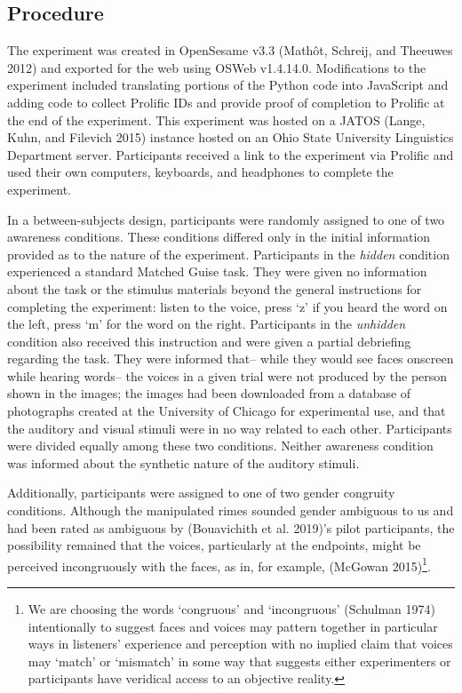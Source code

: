 \documentclass[
  letterpaper,
  DIV=11,
  numbers=noendperiod]{scrartcl}
\begin{document}
\subsection{Procedure}\label{sec-procedure}

The experiment was created in OpenSesame v3.3 (Mathôt, Schreij, and
Theeuwes 2012) and exported for the web using OSWeb v1.4.14.0.
Modifications to the experiment included translating portions of the
Python code into JavaScript and adding code to collect Prolific IDs and
provide proof of completion to Prolific at the end of the experiment.
This experiment was hosted on a JATOS (Lange, Kuhn, and Filevich 2015)
instance hosted on an Ohio State University Linguistics Department
server. Participants received a link to the experiment via Prolific and
used their own computers, keyboards, and headphones to complete the
experiment.

In a between-subjects design, participants were randomly assigned to one
of two awareness conditions. These conditions differed only in the
initial information provided as to the nature of the experiment.
Participants in the \emph{hidden} condition experienced a standard
Matched Guise task. They were given no information about the task or the
stimulus materials beyond the general instructions for completing the
experiment: listen to the voice, press `z' if you heard the word on the
left, press `m' for the word on the right. Participants in the
\emph{unhidden} condition also received this instruction and were given
a partial debriefing regarding the task. They were informed that-- while
they would see faces onscreen while hearing words-- the voices in a
given trial were not produced by the person shown in the images; the
images had been downloaded from a database of photographs created at the
University of Chicago for experimental use, and that the auditory and
visual stimuli were in no way related to each other. Participants were
divided equally among these two conditions. Neither awareness condition
was informed about the synthetic nature of the auditory stimuli.

Additionally, participants were assigned to one of two gender congruity
conditions. Although the manipulated rimes sounded gender ambiguous to
us and had been rated as ambiguous by (Bouavichith et al. 2019)'s pilot
participants, the possibility remained that the voices, particularly at
the endpoints, might be perceived incongruously with the faces, as in,
for example, (McGowan 2015)\footnote{We are choosing the words
  `congruous' and `incongruous' (Schulman 1974) intentionally to suggest
  faces and voices may pattern together in particular ways in listeners'
  experience and perception with no implied claim that voices may
  `match' or `mismatch' in some way that suggests either experimenters
  or participants have veridical access to an objective reality.}.
\end{document}
